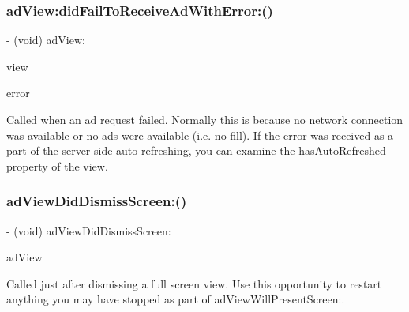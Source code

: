 \subsubsection{\texorpdfstring{ad\+View\+:did\+Fail\+To\+Receive\+Ad\+With\+Error\+:()}{adView:didFailToReceiveAdWithError:()}}
{\footnotesize\ttfamily -\/ (void) ad\+View\+: \begin{DoxyParamCaption}\item[{(\hyperlink{interfaceGADBannerView}{G\+A\+D\+Banner\+View} $\ast$)}]{view }\item[{didFailToReceiveAdWithError:(\hyperlink{interfaceGADRequestError}{G\+A\+D\+Request\+Error} $\ast$)}]{error }\end{DoxyParamCaption}\hspace{0.3cm}{\ttfamily [optional]}}

Called when an ad request failed. Normally this is because no network connection was available or no ads were available (i.\+e. no fill). If the error was received as a part of the server-\/side auto refreshing, you can examine the has\+Auto\+Refreshed property of the view. \mbox{\label{protocolGADBannerViewDelegate-p_a9f7c454662ab86060cc65cdd76f73efd}} 
\subsubsection{\texorpdfstring{ad\+View\+Did\+Dismiss\+Screen\+:()}{adViewDidDismissScreen:()}}
{\footnotesize\ttfamily -\/ (void) ad\+View\+Did\+Dismiss\+Screen\+: \begin{DoxyParamCaption}\item[{(\hyperlink{interfaceGADBannerView}{G\+A\+D\+Banner\+View} $\ast$)}]{ad\+View }\end{DoxyParamCaption}\hspace{0.3cm}{\ttfamily [optional]}}

Called just after dismissing a full screen view. Use this opportunity to restart anything you may have stopped as part of ad\+View\+Will\+Present\+Screen\+:. \mbox{\label{protocolGADBannerViewDelegate-p_ae5529f9b6f571c937a4d56bfc7a4b5cc}} 
